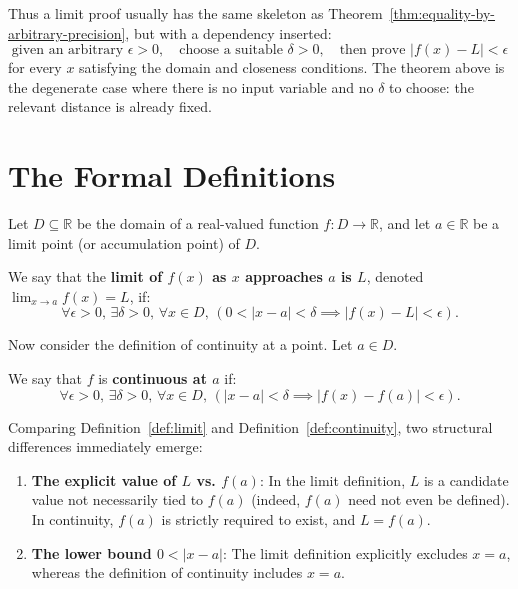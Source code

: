 \documentclass{essay}
\begin{document}
Thus a limit proof usually has the same skeleton as Theorem~\ref{thm:equality-by-arbitrary-precision}, but with a dependency inserted:
\[
\text{given an arbitrary }\epsilon>0,
\quad
\text{choose a suitable }\delta>0,
\quad
\text{then prove } |f(x)-L|<\epsilon
\]
for every $x$ satisfying the domain and closeness conditions. The theorem above is the degenerate case where there is no input variable and no $\delta$ to choose: the relevant distance is already fixed.

\section{The Formal Definitions}

Let $D \subseteq \mathbb{R}$ be the domain of a real-valued function $f: D \to \mathbb{R}$, and let $a \in \mathbb{R}$ be a limit point (or accumulation point) of $D$.

\begin{definition}
\label{def:limit}
We say that the \textbf{limit of $f(x)$ as $x$ approaches $a$ is $L$}, denoted $\lim_{x \to a} f(x) = L$, if:
\[
\forall \epsilon > 0, \, \exists \delta > 0, \, \forall x \in D, \, \left( 0 < |x - a| < \delta \implies |f(x) - L| < \epsilon \right).
\]
\end{definition}

Now consider the definition of continuity at a point. Let $a \in D$.

\begin{definition}
\label{def:continuity}
We say that $f$ is \textbf{continuous at $a$} if:
\[
\forall \epsilon > 0, \, \exists \delta > 0, \, \forall x \in D, \, \left( |x - a| < \delta \implies |f(x) - f(a)| < \epsilon \right).
\]
\end{definition}

Comparing Definition~\ref{def:limit} and Definition~\ref{def:continuity}, two structural differences immediately emerge:
\begin{enumerate}
    \item \textbf{The explicit value of $L$ vs. $f(a)$}: In the limit definition, $L$ is a candidate value not necessarily tied to $f(a)$ (indeed, $f(a)$ need not even be defined). In continuity, $f(a)$ is strictly required to exist, and $L = f(a)$.
    \item \textbf{The lower bound $0 < |x - a|$}: The limit definition explicitly excludes $x = a$, whereas the definition of continuity includes $x = a$.
\end{enumerate}
\end{document}

